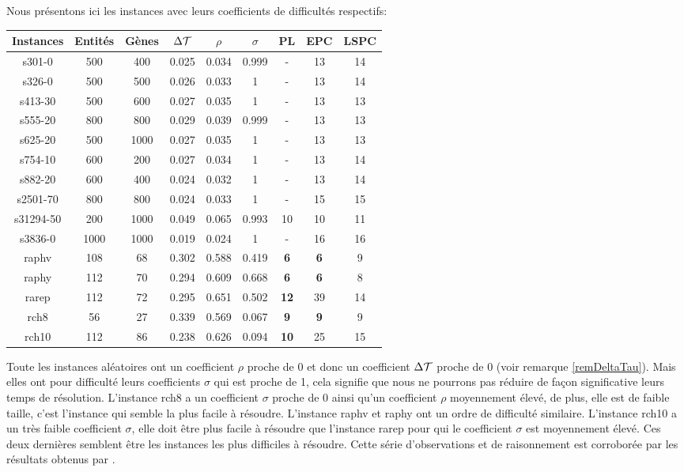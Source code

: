 Nous présentons ici les instances avec leurs coefficients de difficultés respectifs:
\begin{center}
\begin{tabular}{|c|c|c|c|c|c|c|c|c|}
\hline 
Instances & Entités & Gènes & $\Delta\cal{T}$ & $\rho$ & $\sigma$ & PL & EPC & LSPC \\ 
\hline 
s301-0 & 500 & 400 & 0.025 & 0.034 & 0.999 & - & 13 & 14 \\ 
\hline 
s326-0 & 500 & 500 & 0.026 & 0.033 & 1 & - & 13 & 14 \\ 
\hline 
s413-30 & 500 & 600 & 0.027 & 0.035 & 1 & - & 13 & 13 \\ 
\hline 
s555-20 & 800 & 800 & 0.029 & 0.039 & 0.999 & - & 13 & 13 \\ 
\hline 
s625-20 & 500 & 1000 & 0.027 & 0.035 & 1 & - & 13 & 13 \\ 
\hline 
s754-10 & 600 & 200 & 0.027 & 0.034 & 1 & - & 13 & 14 \\ 
\hline 
s882-20 & 600 & 400 & 0.024 & 0.032 & 1 & - & 13 & 14 \\ 
\hline 
s2501-70 & 800 & 800 & 0.024 & 0.033 & 1 & - & 15 & 15 \\ 
\hline 
s31294-50 & 200 & 1000 & 0.049 & 0.065 & 0.993 & 10 & 10 & 11 \\ 
\hline 
s3836-0 & 1000 & 1000 & 0.019 & 0.024 & 1 & - & 16 & 16 \\ 
\hline 
raphv & 108 & 68 & 0.302 & 0.588 & 0.419 & \textbf{6} & \textbf{6} & 9 \\ 
\hline 
raphy & 112 & 70 & 0.294 & 0.609 & 0.668 & \textbf{6} & \textbf{6} & 8 \\ 
\hline 
rarep & 112 & 72 & 0.295 & 0.651 & 0.502 & \textbf{12} & 39 & 14 \\ 
\hline 
rch8 & 56 & 27 & 0.339 & 0.569 & 0.067 & \textbf{9} & \textbf{9} & 9 \\ 
\hline 
rch10 & 112 & 86 & 0.238 & 0.626 & 0.094 & \textbf{10} & 25 & 15 \\ 
\hline 
\end{tabular} 
\end{center}

Toute les instances aléatoires ont un coefficient $\rho$ proche de 0 et donc un coefficient $\Delta\cal{T}$ proche de 0 (voir remarque \ref{remDeltaTau}). Mais elles ont pour difficulté leurs coefficients $\sigma$ qui est proche de 1, cela signifie que nous ne pourrons pas réduire de façon significative leurs temps de résolution. L'instance rch8 a un coefficient $\sigma$ proche de 0 ainsi qu'un coefficient $\rho$ moyennement élevé, de plus, elle est de faible taille, c'est l'instance qui semble la plus facile à résoudre. L'instance raphv et raphy ont un ordre de difficulté similaire.  L'instance rch10 a un très faible coefficient $\sigma$, elle doit être plus facile à résoudre que l'instance rarep pour qui le coefficient $\sigma$ est moyennement élevé. Ces deux dernières semblent être les instances les plus difficiles à résoudre. Cette série d'observations et de raisonnement est corroborée par les résultats obtenus par \cite{Chhel2013}.

